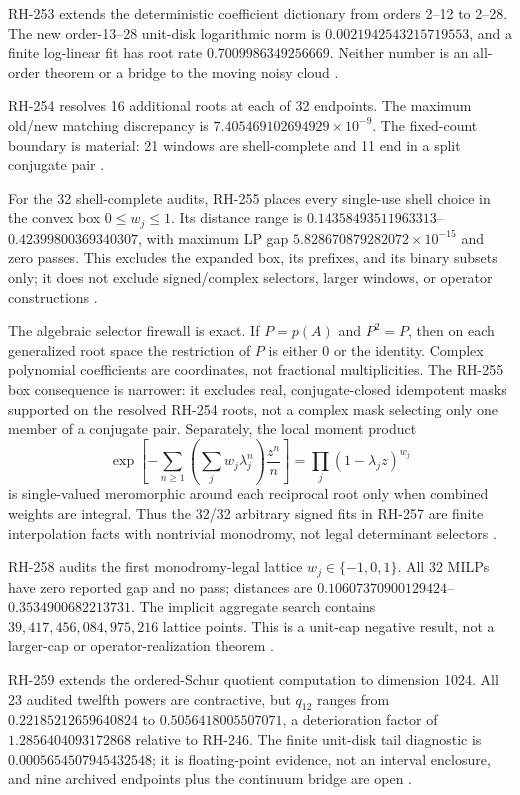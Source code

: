 \documentclass[11pt]{article}
\begin{document}
RH-253 extends the deterministic coefficient dictionary from orders 2--12 to
2--28.  The new order-13--28 unit-disk logarithmic norm is
$0.0021942543215719553$, and a finite log-linear fit has root rate
$0.7009986349256669$.  Neither number is an all-order theorem or a bridge to
the moving noisy cloud \citep{WangRH252,WangRH253}.

RH-254 resolves 16 additional roots at each of 32 endpoints.  The maximum
old/new matching discrepancy is $7.405469102694929\times10^{-9}$.  The
fixed-count boundary is material: 21 windows are shell-complete and 11 end in
a split conjugate pair \citep{WangRH254}.

For the 32 shell-complete audits, RH-255 places every single-use shell choice
in the convex box $0\leq w_j\leq1$.  Its distance range is
$0.14358493511963313$--$0.42399800369340307$, with maximum LP gap
$5.828670879282072\times10^{-15}$ and zero passes.  This excludes the
expanded box, its prefixes, and its binary subsets only; it does not exclude
signed/complex selectors, larger windows, or operator constructions
\citep{WangRH255}.

The algebraic selector firewall is exact.  If $P=p(A)$ and $P^2=P$, then on
each generalized root space the restriction of $P$ is either $0$ or the
identity.  Complex polynomial coefficients are coordinates, not fractional
multiplicities.  The RH-255 box consequence is narrower: it excludes real,
conjugate-closed idempotent masks supported on the resolved RH-254 roots, not
a complex mask selecting only one member of a conjugate pair.  Separately,
the local moment product
\[
 \exp\!\left[-\sum_{n\geq1}\left(\sum_jw_j\lambda_j^n\right)\frac{z^n}{n}\right]
 =\prod_j(1-\lambda_jz)^{w_j}
\]
is single-valued meromorphic around each reciprocal root only when combined
weights are integral.  Thus the 32/32 arbitrary signed fits in RH-257 are
finite interpolation facts with nontrivial monodromy, not legal determinant
selectors \citep{WangRH256,WangRH257}.

RH-258 audits the first monodromy-legal lattice $w_j\in\{-1,0,1\}$.  All
32 MILPs have zero reported gap and no pass; distances are
$0.10607370900129424$--$0.3534900682213731$.  The implicit aggregate search
contains $39{,}417{,}456{,}084{,}975{,}216$ lattice points.  This is a unit-cap
negative result, not a larger-cap or operator-realization theorem
\citep{WangRH258}.

RH-259 extends the ordered-Schur quotient computation to dimension 1024.
All 23 audited twelfth powers are contractive, but $q_{12}$ ranges from
$0.22185212659640824$ to $0.5056418005507071$, a deterioration factor of
$1.2856404093172868$ relative to RH-246.  The finite unit-disk tail diagnostic
is $0.0005654507945432548$; it is floating-point evidence, not an interval
enclosure, and nine archived endpoints plus the continuum bridge are open
\citep{WangRH259}.
\end{document}

